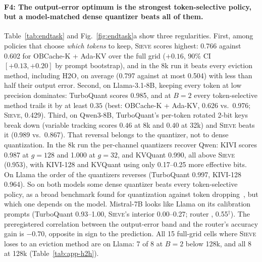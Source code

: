 \documentclass{article}
\newif\ifshowtbd \showtbdtrue
\newcommand{\tbd}[1]{\ifshowtbd{\color{tbdcol}\textbf{TBD}~#1}\else\ifhmode\unskip\fi\fi}
\newif\ifshowest \showesttrue
\DeclareRobustCommand{\est}[1]{\ifshowest{\color{estcol}#1$^{\dagger}$}\else---\fi}
\DeclareRobustCommand{\estonly}[1]{\ifshowest#1\else\ifhmode\unskip\fi\fi}
\newcommand{\sieve}{\textsc{Sieve}}
\theoremstyle{definition}
\begin{document}

\paragraph{F4: The output-error optimum is the strongest token-selective policy, but a model-matched dense quantizer beats all of them.}
Table~\ref{tab:endtask} and Fig.~\ref{fig:endtask}a show three regularities.  First, among policies that choose \emph{which tokens} to keep, \sieve{} scores highest: 0.766 against 0.602 for OBCache-K + Ada-KV over the full grid ($+0.16$, 90\% CI $[+0.13,+0.20]$ by prompt bootstrap), and in the 8k run it beats every eviction method, including H2O, on average (0.797 against at most 0.504) with less than half their output error.  Second, on Llama-3.1-8B, keeping every token at low precision dominates: TurboQuant scores 0.985, and at $B=2$ every token-selective method trails it by at least $0.35$ (best: OBCache-K + Ada-KV, 0.626 vs.\ 0.976; \sieve{}, 0.429).  Third, on Qwen3-8B, TurboQuant's per-token rotated 2-bit keys break down (variable tracking scores $0.46$ at 8k and $0.40$ at 32k) and \sieve{} beats it (0.989 vs.\ 0.867).  That reversal belongs to the quantizer, not to dense quantization.  In the 8k run the per-channel quantizers recover Qwen: KIVI scores 0.987 at $g{=}128$ and 1.000 at $g{=}32$, and KVQuant 0.990, all above \sieve{} (0.953), with KIVI-128 and KVQuant using only 0.17--0.25 more effective bits.  On Llama the order of the quantizers reverses (TurboQuant 0.997, KIVI-128 0.964).  So on both models some dense quantizer beats every token-selective policy, as a broad benchmark found for quantization against token dropping~\citep{yuan2024kvbench}, but which one depends on the model.  Mistral-7B looks like Llama on its calibration prompts (TurboQuant 0.93--1.00, \sieve{}'s interior 0.00--0.27; router \estonly{, \est{0.55}}).  The preregistered correlation between the output-error band and the router's accuracy gain is $-0.70$, opposite in sign to the prediction.  All 15 full-grid cells where \sieve{} loses to an eviction method are on Llama: 7 of 8 at $B=2$ below 128k, and all 8 at 128k (Table~\ref{tab:app-h2h}).
\end{document}
